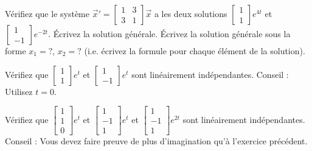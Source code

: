 \begin{exercise}
\leavevmode
\begin{tasks}
\task
Vérifiez que le système ${\vec{x}}' =
\left[ \begin{smallmatrix}
1 & 3 \\ 3 & 1
\end{smallmatrix} \right] \vec{x}$ a les deux solutions
$\left[ \begin{smallmatrix}
1 \\ 1
\end{smallmatrix} \right] e^{4t}$ et
$\left[ \begin{smallmatrix}
1 \\ -1
\end{smallmatrix} \right] e^{-2t}$.
\task
Écrivez la solution générale.
\task
Écrivez la solution générale sous la forme $x_1 = ?$, $x_2 = ?$
(i.e. écrivez la formule pour chaque élément de la solution).
\end{tasks}
\end{exercise}

\begin{exercise}
Vérifiez que
$\left[ \begin{smallmatrix}
1 \\ 1
\end{smallmatrix} \right] e^{t}$ et
$\left[ \begin{smallmatrix}
1 \\ -1
\end{smallmatrix} \right] e^{t}$ 
sont linéairement indépendantes. Conseil : Utilisez $t=0$.
\end{exercise}

\begin{exercise}
Vérifiez que
$\left[ \begin{smallmatrix}
1 \\ 1 \\ 0
\end{smallmatrix} \right] e^{t}$ et
$\left[ \begin{smallmatrix}
1 \\ -1 \\ 1
\end{smallmatrix} \right] e^{t}$ 
et
$\left[ \begin{smallmatrix}
1 \\ -1 \\ 1
\end{smallmatrix} \right] e^{2t}$ 
sont linéairement indépendantes. Conseil : Vous devez faire preuve de plus d’imagination qu’à l’exercice précédent.
\end{exercise}

